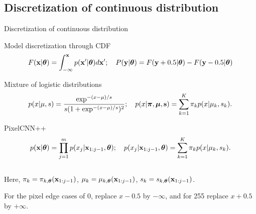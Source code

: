 \subsection{Discretization of continuous distribution}
\begin{frame}{Discretization of continuous distribution}
	\vspace{-0.3cm}
	\begin{block}{Model discretization through CDF}
		\vspace{-0.6cm}
		\[
			F(\mathbf{x} | \boldsymbol{\theta}) = \int_{-\infty}^{\mathbf{x}} p(\mathbf{x}' | \boldsymbol{\theta}) d\mathbf{x}'; \quad 
			P(\mathbf{y} | \boldsymbol{\theta}) = F(\mathbf{y} + 0.5 | \boldsymbol{\theta}) - F(\mathbf{y} - 0.5 | \boldsymbol{\theta})
		\]
	\end{block}
	\vspace{-0.6cm}
	\begin{block}{Mixture of logistic distributions}
		\vspace{-0.7cm}
		\[
			p(x | \mu, s) = \frac{\exp^{-(x - \mu) / s}}{s (1 + \exp^{-(x - \mu) / s})^2}; \quad p(x | \boldsymbol{\pi}, \boldsymbol{\mu}, \mathbf{s}) = \sum_{k=1}^K \pi_k p(x | \mu_k, s_k).
		\]
		\vspace{-0.7cm}
	\end{block}
	\begin{block}{PixelCNN++}
		\vspace{-0.7cm}
		\[
			p(\mathbf{x} | \boldsymbol{\theta}) = \prod_{j=1}^m p(x_j | \mathbf{x}_{1:j-1}, \boldsymbol{\theta}); \quad p(x_j | \mathbf{x}_{1:j-1}, \boldsymbol{\theta}) = \sum_{k=1}^K \pi_k p(x | \mu_k, s_k).
		\]
		\vspace{-0.5cm} \\
		Here, $\pi_k = \pi_{k, \boldsymbol{\theta}}(\mathbf{x}_{1:j-1})$, $\mu_k = \mu_{k, \boldsymbol{\theta}}(\mathbf{x}_{1:j-1})$, $s_k = s_{k, \boldsymbol{\theta}}(\mathbf{x}_{1:j-1})$.
	\end{block}

	For the pixel edge cases of 0, replace $x - 0.5$ by $-\infty$, and for 255 replace $x + 0.5$ by $+\infty$.
	\end{frame}
